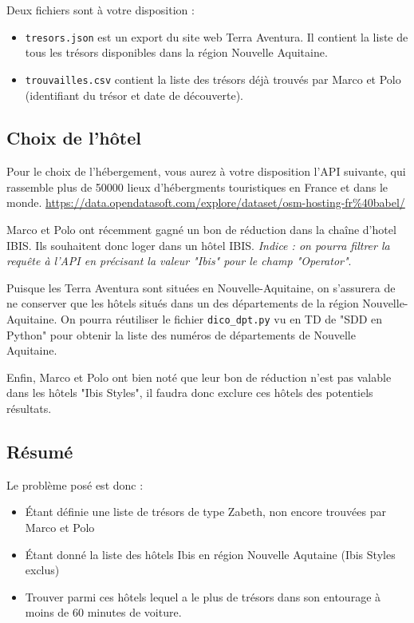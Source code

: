 \documentclass[11pt,a4paper]{article}
\begin{document}
Deux fichiers sont à votre disposition : 
\begin{itemize}
\item \verb+tresors.json+ est un export du site web Terra Aventura. Il contient la liste de tous les trésors disponibles dans la région Nouvelle Aquitaine.
\item \verb+trouvailles.csv+ contient la liste des trésors déjà trouvés par Marco et Polo (identifiant du trésor et date de découverte).
\end{itemize}

\subsection{Choix de l'hôtel}\label{hotel}

Pour le choix de l'hébergement, vous aurez à votre disposition l'API suivante, qui rassemble plus de 50000 lieux d'hébergments touristiques en France et dans le monde. 
\url{https://data.opendatasoft.com/explore/dataset/osm-hosting-fr%40babel/}

Marco et Polo ont récemment gagné un bon de réduction dans la chaîne d'hotel IBIS. Ils souhaitent donc loger dans un hôtel IBIS. \emph{Indice : on pourra filtrer la requête à l'API en précisant la valeur "Ibis" pour le champ "Operator"}.

Puisque les Terra Aventura sont situées en Nouvelle-Aquitaine, on s'assurera de ne conserver que les hôtels situés dans un des départements de la région Nouvelle-Aquitaine. On pourra réutiliser le fichier \verb+dico_dpt.py+ vu en TD de "SDD en Python" pour obtenir la liste des numéros de départements de Nouvelle Aquitaine. 

Enfin, Marco et Polo ont bien noté que leur bon de réduction n'est pas valable dans les hôtels "Ibis Styles", il faudra donc exclure ces hôtels des potentiels résultats.

\subsection{Résumé}
Le problème posé est donc : 

\begin{itemize}
    \item Étant définie une liste de trésors de type Zabeth, non encore trouvées par Marco et Polo
    \item Étant donné la liste des hôtels Ibis en région Nouvelle Aqutaine (Ibis Styles exclus)
    \item Trouver parmi ces hôtels lequel a le plus de trésors dans son entourage à moins de 60 minutes de voiture.
\end{itemize}
\end{document}
